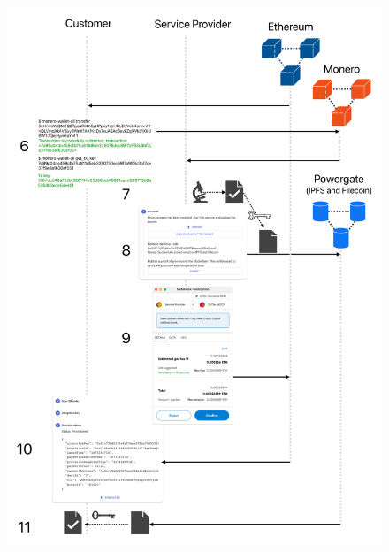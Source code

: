 \documentclass{ieeeaccess}
\begin{document}
\begin{figure}[ht]
  \begin{center}
  \includegraphics[width=\textwidth,height=\textheight,keepaspectratio]{experiment2.pdf}
  \end{center}
\end{figure}
\end{document}
